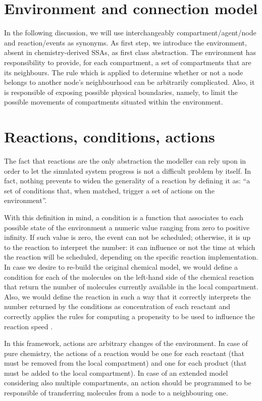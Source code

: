 \documentclass[12pt,a4paper,twoside,openright]{book}
\begin{document}
\section{Environment and connection model}

In the following discussion, we will use interchangeably compartment/agent/node and reaction/events as synonyms.
%
As first step, we introduce the environment, absent in chemistry-derived SSAs, as first class abstraction.
%
The environment has responsibility to provide, for each compartment, a set of compartments that are its neighbours.
%
The rule which is applied to determine whether or not a node belongs to another node's neighbourhood  can be arbitrarily complicated.
%
Also, it is responsible of exposing possible physical boundaries, namely, to limit the possible movements of compartments situated within the environment.

\section{Reactions, conditions, actions}

The fact that reactions are the only abstraction the modeller can rely upon in order to let the simulated system progress is not a difficult problem by itself.
%
In fact, nothing prevents to widen the generality of a reaction by defining it as: ``a set of conditions that, when matched, trigger a set of actions on the environment''.

With this definition in mind, a condition is a function that associates to each possible state of the environment a numeric value ranging from zero to positive infinity.
%
If such value is zero, the event can not be scheduled; otherwise, it is up to the reaction to interpret the number: it can influence or not the time at which the reaction will be scheduled, depending on the specific reaction implementation.
%
In case we desire to re-build the original chemical model, we would define a condition for each of the molecules on the left-hand side of the chemical reaction that return the number of molecules currently available in the local compartment.
%
Also, we would define the reaction in such a way that it correctly interprets the number returned by the conditions as concentration of each reactant and correctly applies the rules for computing a propensity to be used to influence the reaction speed \cite{gillespie1977}.

In this framework, actions are arbitrary changes of the environment.
%
In case of pure chemistry, the actions of a reaction would be one for each reactant (that must be removed from the local compartment) and one for each product (that must be added to the local compartment).
%
In case of an extended model considering also multiple compartments, an action should be programmed to be responsible of transferring molecules from a node to a neighbouring one.
\end{document}
